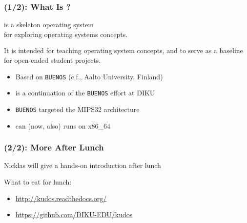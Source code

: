 \begin{frame}

\frametitle{\kudos{} (1/2): What Is \kudos{}?}

\vspace{\fill}

\begin{center}

\kudos{} is a skeleton operating system \\ for exploring operating systems
concepts.

\medskip

It is intended for teaching operating system concepts, and to serve as a
baseline for open-ended student projects.

\end{center}

\medskip

\begin{itemize}

\item Based on \texttt{BUENOS} (c.f., Aalto University, Finland)

\item \kudos{} is a continuation of the \texttt{BUENOS} effort at DIKU

\item \texttt{BUENOS} targeted the MIPS32 architecture

\item \kudos{} can (now, also) runs on x86\_64

\end{itemize}

\vspace{\fill}

\end{frame}


\begin{frame}[fragile]

\frametitle{\kudos{} (2/2): More \kudos{} After Lunch}

\vspace{\fill}

\begin{center}

Nicklas will give a hands-on introduction after lunch

\end{center}

\vspace{\fill}

What to eat for lunch:

\begin{itemize}

\item \url{http://kudos.readthedocs.org/}

\item \url{https://github.com/DIKU-EDU/kudos}

\end{itemize}

\vspace{\fill}

\end{frame}

